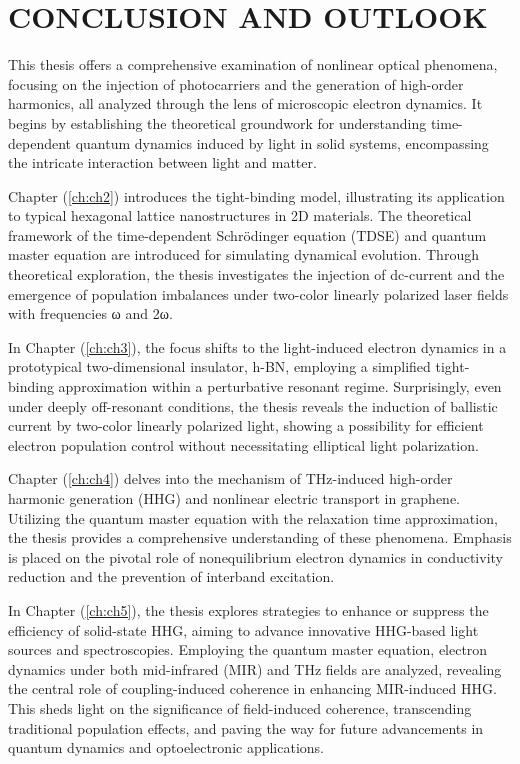 \chapter{CONCLUSION AND OUTLOOK \label{ch:ch6}}
This thesis offers a comprehensive examination of nonlinear optical phenomena, focusing on the injection of photocarriers and the generation of high-order harmonics, all analyzed through the lens of microscopic electron dynamics. It begins by establishing the theoretical groundwork for understanding time-dependent quantum dynamics induced by light in solid systems, encompassing the intricate interaction between light and matter.

Chapter (\ref{ch:ch2}) introduces the tight-binding model, illustrating its application to typical hexagonal lattice nanostructures in 2D materials. The theoretical framework of the time-dependent Schrödinger equation (TDSE) and quantum master equation are introduced for simulating dynamical evolution. Through theoretical exploration, the thesis investigates the injection of dc-current and the emergence of population imbalances under two-color linearly polarized laser fields with frequencies ω and 2ω.

In Chapter (\ref{ch:ch3}), the focus shifts to the light-induced electron dynamics in a prototypical two-dimensional insulator, \gls{h-BN}, employing a simplified tight-binding approximation within a perturbative resonant regime. Surprisingly, even under deeply off-resonant conditions, the thesis reveals the induction of ballistic current by two-color linearly polarized light, showing a possibility for efficient electron population control without necessitating elliptical light polarization.

Chapter (\ref{ch:ch4}) delves into the mechanism of THz-induced high-order harmonic generation (HHG) and nonlinear electric transport in graphene. Utilizing the quantum master equation with the relaxation time approximation, the thesis provides a comprehensive understanding of these phenomena. Emphasis is placed on the pivotal role of nonequilibrium electron dynamics in conductivity reduction and the prevention of interband excitation.

In Chapter (\ref{ch:ch5}), the thesis explores strategies to enhance or suppress the efficiency of solid-state HHG, aiming to advance innovative HHG-based light sources and spectroscopies. Employing the quantum master equation, electron dynamics under both mid-infrared (MIR) and THz fields are analyzed, revealing the central role of coupling-induced coherence in enhancing MIR-induced HHG. This sheds light on the significance of field-induced coherence, transcending traditional population effects, and paving the way for future advancements in quantum dynamics and optoelectronic applications.

